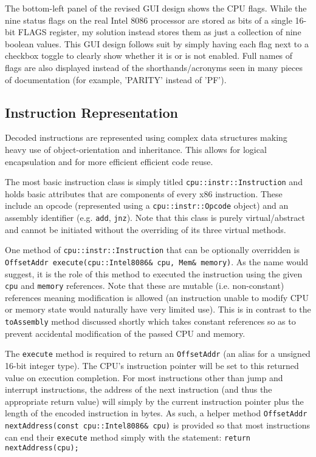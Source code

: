     The bottom-left panel of the revised GUI design shows the CPU flags. While the nine status flags on the real Intel 8086 processor are stored as bits of a single 16-bit FLAGS register, my solution instead stores them as just a collection of nine boolean values. This GUI design follows suit by simply having each flag next to a checkbox toggle to clearly show whether it is or is not enabled. Full names of flags are also displayed instead of the shorthands/acronyms seen in many pieces of documentation (for example, 'PARITY' instead of 'PF').


\subsection{Instruction Representation}
    Decoded instructions are represented using complex data structures making heavy use of object-orientation and inheritance. This allows for logical encapsulation and for more efficient efficient code reuse.

    The most basic instruction class is simply titled \texttt{cpu::instr::Instruction} and holds basic attributes that are components of every x86 instruction. These include an opcode (represented using a \texttt{cpu::instr::Opcode} object) and an assembly identifier (e.g. \texttt{add}, \texttt{jnz}). Note that this class is purely virtual/abstract and cannot be initiated without the overriding of its three virtual methods.

    One method of \texttt{cpu::instr::Instruction} that can be optionally overridden is \texttt{OffsetAddr execute(cpu::Intel8086\& cpu, Mem\& memory)}. As the name would suggest, it is the role of this method to executed the instruction using the given \texttt{cpu} and \texttt{memory} references. Note that these are mutable (i.e. non-constant) references meaning modification is allowed (an instruction unable to modify CPU or memory state would naturally have very limited use). This is in contrast to the \texttt{toAssembly} method discussed shortly which takes constant references so as to prevent accidental modification of the passed CPU and memory.

    The \texttt{execute} method is required to return an \texttt{OffsetAddr} (an alias for a unsigned 16-bit integer type). The CPU's instruction pointer will be set to this returned value on execution completion. For most instructions other than jump and interrupt instructions, the address of the next instruction (and thus the appropriate return value) will simply by the current instruction pointer plus the length of the encoded instruction in bytes. As such, a helper method \texttt{OffsetAddr nextAddress(const cpu::Intel8086\& cpu)} is provided so that most instructions can end their \texttt{execute} method simply with the statement: \texttt{return nextAddress(cpu);}

